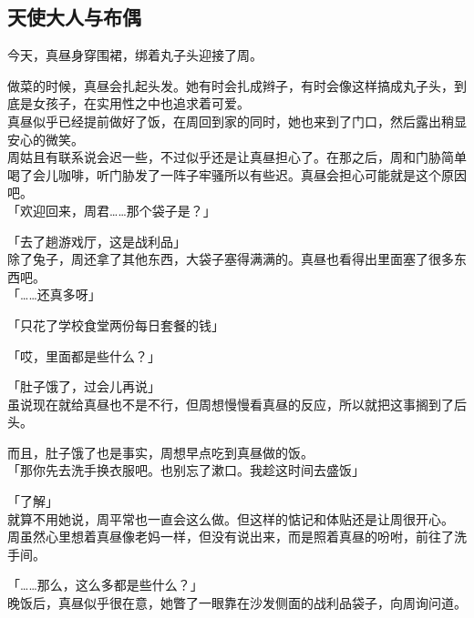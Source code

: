 \subsection{天使大人与布偶}

今天，真昼身穿围裙，绑着丸子头迎接了周。

做菜的时候，真昼会扎起头发。她有时会扎成辫子，有时会像这样搞成丸子头，到底是女孩子，在实用性之中也追求着可爱。\\

真昼似乎已经提前做好了饭，在周回到家的同时，她也来到了门口，然后露出稍显安心的微笑。\\

周姑且有联系说会迟一些，不过似乎还是让真昼担心了。在那之后，周和门胁简单喝了会儿咖啡，听门胁发了一阵子牢骚所以有些迟。真昼会担心可能就是这个原因吧。\\

「欢迎回来，周君……那个袋子是？」

「去了趟游戏厅，这是战利品」\\

除了兔子，周还拿了其他东西，大袋子塞得满满的。真昼也看得出里面塞了很多东西吧。\\

「……还真多呀」

「只花了学校食堂两份每日套餐的钱」

「哎，里面都是些什么？」

「肚子饿了，过会儿再说」\\

虽说现在就给真昼也不是不行，但周想慢慢看真昼的反应，所以就把这事搁到了后头。

而且，肚子饿了也是事实，周想早点吃到真昼做的饭。\\

「那你先去洗手换衣服吧。也别忘了漱口。我趁这时间去盛饭」

「了解」\\

就算不用她说，周平常也一直会这么做。但这样的惦记和体贴还是让周很开心。\\

周虽然心里想着真昼像老妈一样，但没有说出来，而是照着真昼的吩咐，前往了洗手间。\\

\vspace{2\baselineskip}

「……那么，这么多都是些什么？」\\

晚饭后，真昼似乎很在意，她瞥了一眼靠在沙发侧面的战利品袋子，向周询问道。\\

